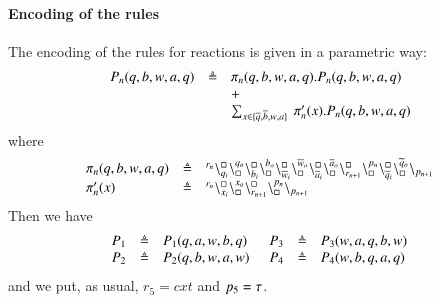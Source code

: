 \paragraph{Encoding of the rules}
The encoding of the rules for reactions is  given in a parametric way:
\[
\begin{array}{lcl}
P_n(q,b,w,a,q) & \triangleq & \pi_n(q,b,w,a,q).P_n(q,b,w,a,q)  \\
			&& +\\
			&& \sum_{x\in\{\overline{q},\overline{b},w,a\}}\ \pi'_n(x).P_n(q,b,w,a,q)\\
			\end{array}
			\]
			\noindent
			where
			\[
\begin{array}{lcl}
\pi_n(q,b,w,a,q) &\triangleq & {}^{r_n}\backslash_{q_i}^{\scriptstyle {\square}}\backslash_{\scriptstyle {\square}}^{q_o}
                                                    \backslash_{b_i}^{\scriptstyle {\square}}\backslash_{\scriptstyle {\square}}^{b_o}
                                                     \backslash_{\overline{w}_i}^{\scriptstyle {\square}}\backslash_{\scriptstyle {\square}}^{\overline{w}_o}
					        \backslash_{\overline{a}_i}^{\scriptstyle {\square}}\backslash_{\scriptstyle {\square}}^{\overline{a}_o}
					        \backslash_{r_{n+1}}^{\scriptstyle {\square}}\backslash_{\scriptstyle {\square}}^{p_n}
					        \backslash_{\widetilde{q}_i}^{\scriptstyle {\square}}\backslash_{\scriptstyle {\square}}^{\widetilde{q}_o}
			\backslash_{p_{n+1}}\\
\pi'_n(x) &\triangleq &  {}^{r_n}\backslash_{x_i}^{\scriptstyle {\square}}\backslash_{\scriptstyle {\square}}^{x_o}\backslash_{r_{n+1}}^{\scriptstyle {\square}}\backslash_{\scriptstyle {\square}}^{p_n} \backslash_{p_{n+1}} 
\end{array}
\]
\noindent
Then we have 
\[
\begin{array}{lcl @{\hspace{0.5cm}}lcl  }
P_1 & \defeq & P_1(q,a,w,b,q) & P_3 & \defeq & P_3(w,a,q,b,w)  \\
P_2 & \defeq & P_2(q,b,w,a,w) &P_4 & \defeq & P_4(w,b,q,a,q) 
\end{array}
\]
\noindent
and we put, as usual,
$r_5 = \mathit{cxt}$ and  $p_5 = \tau$.

